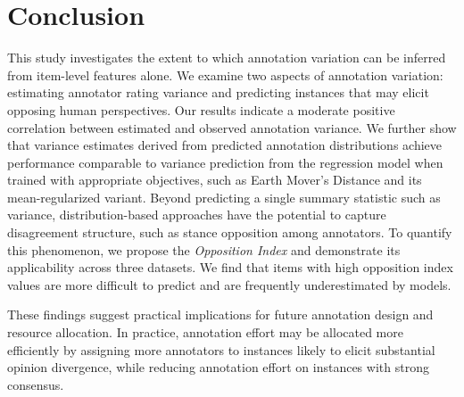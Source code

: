 \documentclass{article} %
\begin{document}

 

\section{Conclusion}
This study investigates the extent to which annotation variation can be inferred from item-level features alone. We examine two aspects of annotation variation: estimating annotator rating variance and predicting instances that may elicit opposing human perspectives. Our results indicate a moderate positive correlation between estimated and observed annotation variance. We further show that variance estimates derived from predicted annotation distributions achieve performance comparable to variance prediction from the regression model when trained with appropriate objectives, such as Earth Mover’s Distance and its mean-regularized variant.
Beyond predicting a single summary statistic such as variance, distribution-based approaches have the potential to capture disagreement structure, such as stance opposition among annotators. To quantify this phenomenon, we propose the \textit{Opposition Index} and demonstrate its applicability across three datasets. We find that items with high opposition index values are more difficult to predict and are frequently underestimated by models.

\vspace{0.12cm}
These findings suggest practical implications for future annotation design and resource allocation. In practice, annotation effort may be allocated more efficiently by assigning more annotators to instances likely to elicit substantial opinion divergence, while reducing annotation effort on instances with strong consensus.
\end{document}

